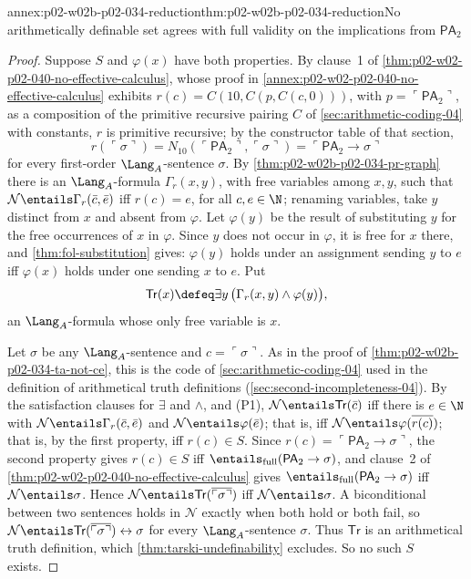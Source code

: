 \begin{annexitem}{annex:p02-w02b-p02-034-reduction}{thm:p02-w02b-p02-034-reduction}{No arithmetically definable set agrees with full validity on the implications from \(\mathsf{PA}_2\)}
\begin{proof}
Suppose \(S\) and \(\varphi(x)\) have both properties.  By clause~1 of
\cref{thm:p02-w02-p02-040-no-effective-calculus}, whose proof in
\cref{annex:p02-w02-p02-040-no-effective-calculus} exhibits
\(r(c)=C(10,C(p,C(c,0)))\), with \(p=\ulcorner\mathsf{PA}_2\urcorner\), as a
composition of the primitive recursive pairing \(C\) of
\cref{sec:arithmetic-coding-04} with constants, \(r\) is primitive
recursive; by the constructor table of that section,
\[
 r(\ulcorner\sigma\urcorner)
 =N_{10}(\ulcorner\mathsf{PA}_2\urcorner,\ulcorner\sigma\urcorner)
 =\ulcorner\mathsf{PA}_2\to\sigma\urcorner
\]
for every first-order \(\Lang_A\)-sentence \(\sigma\).  By
\cref{thm:p02-w02b-p02-034-pr-graph} there is an \(\Lang_A\)-formula
\(\Gamma_r(x,y)\), with free variables among \(x,y\), such that
\(\mathcal N\entails\Gamma_r(\bar c,\bar e)\) iff \(r(c)=e\), for all
\(c,e\in\N\); renaming variables, take \(y\) distinct from \(x\) and absent
from \(\varphi\).  Let \(\varphi(y)\) be the result of substituting \(y\) for
the free occurrences of \(x\) in \(\varphi\).  Since \(y\) does not occur in
\(\varphi\), it is free for \(x\) there, and \cref{thm:fol-substitution}
gives: \(\varphi(y)\) holds under an assignment sending \(y\) to \(e\) iff
\(\varphi(x)\) holds under one sending \(x\) to \(e\).  Put
\[
 \mathsf{Tr}(x)\defeq\exists y\,\bigl(\Gamma_r(x,y)\land\varphi(y)\bigr),
\]
an \(\Lang_A\)-formula whose only free variable is \(x\).

Let \(\sigma\) be any \(\Lang_A\)-sentence and \(c=\ulcorner\sigma\urcorner\).
As in the proof of \cref{thm:p02-w02b-p02-034-ta-not-ce}, this is the code of
\cref{sec:arithmetic-coding-04} used in the definition of arithmetical truth
definitions (\cref{sec:second-incompleteness-04}).  By the satisfaction
clauses for \(\exists\) and \(\land\), and (P1),
\(\mathcal N\entails\mathsf{Tr}(\bar c)\) iff there is \(e\in\N\) with
\(\mathcal N\entails\Gamma_r(\bar c,\bar e)\) and
\(\mathcal N\entails\varphi(\bar e)\); that is, iff
\(\mathcal N\entails\varphi(\overline{r(c)})\); that is, by the first
property, iff \(r(c)\in S\).  Since \(r(c)=\ulcorner\mathsf{PA}_2\to\sigma\urcorner\),
the second property gives \(r(c)\in S\) iff
\(\entails_{\mathrm{full}}(\mathsf{PA}_2\to\sigma)\), and clause~2 of
\cref{thm:p02-w02-p02-040-no-effective-calculus} gives
\(\entails_{\mathrm{full}}(\mathsf{PA}_2\to\sigma)\) iff
\(\mathcal N\entails\sigma\).  Hence
\(\mathcal N\entails\mathsf{Tr}(\overline{\ulcorner\sigma\urcorner})\) iff
\(\mathcal N\entails\sigma\).  A biconditional between two sentences holds in
\(\mathcal N\) exactly when both hold or both fail, so
\(\mathcal N\entails\mathsf{Tr}(\overline{\ulcorner\sigma\urcorner})\leftrightarrow\sigma\)
for every \(\Lang_A\)-sentence \(\sigma\).  Thus \(\mathsf{Tr}\) is an
arithmetical truth definition, which \cref{thm:tarski-undefinability}
excludes.  So no such \(S\) exists.
\end{proof}
\end{annexitem}

